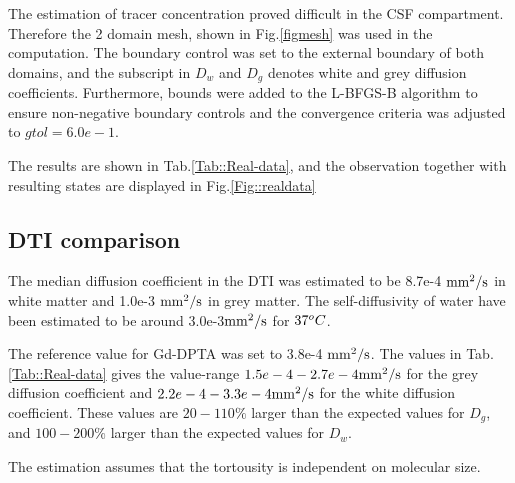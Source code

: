 \documentclass[11pt,a4paper]{article}
\begin{document}
The estimation of tracer concentration proved difficult in the CSF compartment. Therefore the 2 domain mesh, shown in Fig.\ref{figmesh} was used in the computation. The boundary control was set to the external boundary of both domains, and the subscript in $D_w$ and $D_g$ denotes white and grey diffusion coefficients. Furthermore, bounds were added to the L-BFGS-B algorithm to ensure non-negative boundary controls and the convergence criteria was adjusted to $gtol=6.0e-1$. 

The results are shown in Tab.\ref{Tab::Real-data}, 
and the observation together with resulting states are displayed in Fig.\ref{Fig::realdata}


 

\subsection*{DTI comparison}
The median diffusion coefficient in the DTI was estimated to be 8.7e-4 $\mathrm{mm\sp{2}/s}$ in   white matter and 1.0e-3 $\mathrm{mm\sp{2}/s}$ in grey matter.   %
The self-diffusivity of water have been estimated to be around 3.0e-3$\mathrm{mm\sp{2}/s}$ for  $37\sp{o}C$.%

The reference value for Gd-DPTA was set to 3.8e-4 $\mathrm{mm\sp{2}/s}$. The values in Tab.\ref{Tab::Real-data} gives the value-range $1.5e-4 -2.7e-4\mathrm{mm\sp{2}/s}$ for the grey diffusion coefficient and  $2.2e-4 - 3.3e-4\mathrm{mm\sp{2}/s}$ for the white diffusion coefficient. These values are $20 -110 \%$ larger than the expected values for $D_{g}$,  and $100 - 200 \%$ larger than the expected values for $D_{w}$. 

The estimation assumes that the tortousity is independent on molecular size.




%
% 
\end{document}

